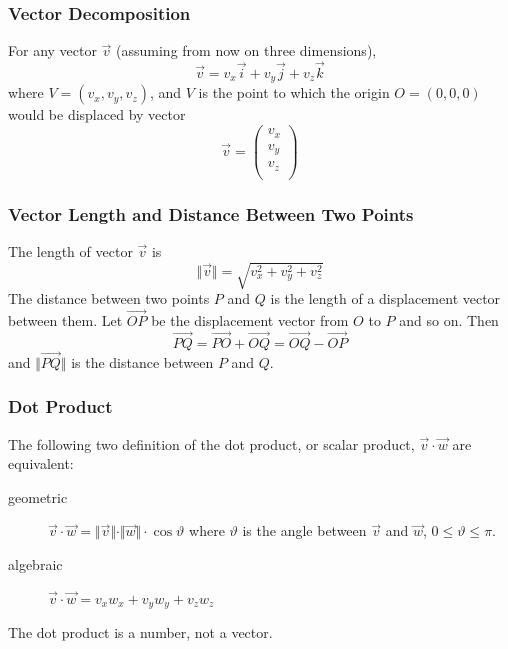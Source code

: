\documentclass[xcolor=dvipsnames]{beamer}
\begin{document}
\begin{frame}
  \frametitle{Vector Decomposition}
  For any vector $\vec{v}$  (assuming from now on three dimensions),
  \begin{equation}
    \label{eq:teequahg}
    \vec{v}=v_{x}\vec{i}+v_{y}\vec{j}+v_{z}\vec{k}
  \end{equation}
where $V=(v_{x},v_{y},v_{z})$, and $V$ is the point to which the
origin $O=(0,0,0)$ would be displaced by vector
\begin{equation}
  \label{eq:zaegiexo}
  \vec{v}=\left(
    \begin{array}{c}
      v_{x} \\
      v_{y} \\
      v_{z} \\
    \end{array}\right)
\end{equation}
\end{frame}

\begin{frame}
  \frametitle{Vector Length and Distance Between Two Points}
  The length of vector $\vec{v}$ is
  \begin{equation}
    \label{eq:ogeithie}
    \Vert\vec{v}\Vert=\sqrt{v_{x}^{2}+v_{y}^{2}+v_{z}^{2}}
  \end{equation}
The distance between two points $P$ and $Q$ is the length of a
displacement vector between them. Let $\vec{OP}$ be the displacement
vector from $O$ to $P$ and so on. Then
\begin{equation}
  \label{eq:ahnoocae}
  \vec{PQ}=\vec{PO}+\vec{OQ}=\vec{OQ}-\vec{OP}
\end{equation}
and $\Vert\vec{PQ}\Vert$ is the distance between $P$ and $Q$.
\end{frame}

\begin{frame}
  \frametitle{Dot Product}
  The following two definition of the \alert{dot product}, or
  \alert{scalar product}, $\vec{v}\cdot\vec{w}$ are equivalent:
  \begin{description}
  \item[geometric]
    $\vec{v}\cdot\vec{w}=\Vert\vec{v}\Vert\cdot\Vert\vec{w}\Vert\cdot\cos\vartheta$
    where $\vartheta$ is the angle between $\vec{v}$ and $\vec{w}$,
    $0\leq\vartheta\leq\pi$.
  \item[algebraic] $\vec{v}\cdot\vec{w}=v_{x}w_{x}+v_{y}w_{y}+v_{z}w_{z}$
  \end{description}
The dot product is a number, not a vector.
\end{frame}
\end{document}
